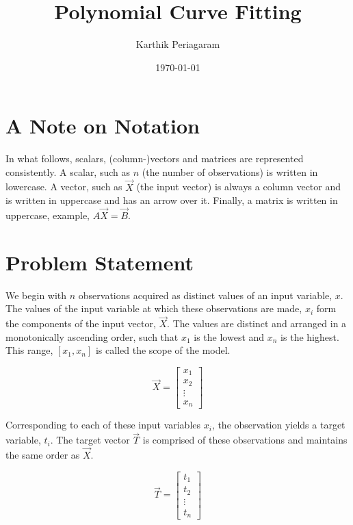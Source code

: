 \documentclass{article}
\title{Polynomial Curve Fitting}
\author{Karthik Periagaram}
\date{\today}
\begin{document}
\maketitle

\section{A Note on Notation}

In what follows, scalars, (column-)vectors and matrices are represented consistently.
A scalar, such as \(n\) (the number of observations) is written in lowercase.
A vector, such as \(\vec{X}\) (the input vector) is always a column vector and is written in uppercase and has an arrow over it.
Finally, a matrix is written in uppercase, example, \(A\vec{X}=\vec{B}\).

\section{Problem Statement}

We begin with \(n\) observations acquired as distinct values of an input variable, \(x\).
The values of the input variable at which these observations are made, \(x_i\) form the components of the input vector, \(\vec{X}\).
The values are distinct and arranged in a monotonically ascending order, such that \(x_1\) is the lowest and \(x_n\) is the highest.
This range, \([x_1,x_n]\) is called the scope of the model.

\begin{equation}
    \vec{X} = \begin{bmatrix}
        x_1     \\
        x_2     \\
        \vdots  \\
        x_n
    \end{bmatrix}
\end{equation}

Corresponding to each of these input variables \(x_i\), the observation yields a target variable, \(t_i\).
The target vector \(\vec{T}\) is comprised of these observations and maintains the same order as \(\vec{X}\).

\begin{equation}
    \vec{T} = \begin{bmatrix}
        t_1     \\
        t_2     \\
        \vdots  \\
        t_n
    \end{bmatrix}
\end{equation}
\end{document}
